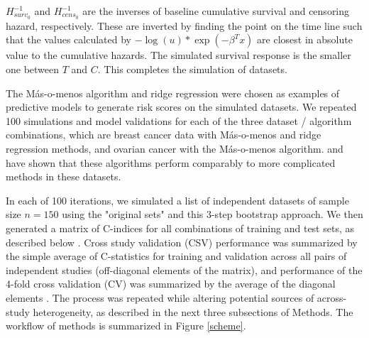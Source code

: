 \documentclass{bioinfo}
\begin{document}
    $H_{surv_{0}}^{-1}$ and $H_{cens_{0}}^{-1}$ are the inverses
    of baseline cumulative survival and censoring hazard, respectively.  These
    are inverted by finding
    the point on the time line such that the values calculated by
    $- \log(u) * \exp(- \beta^{T}x)$ are closest in absolute value to the
    cumulative hazards. The simulated survival response is the smaller one between
    $T$ and $C$. This completes the simulation of datasets.

	The M\'{a}s-o-menos algorithm \citep{Zhao2014, donoho2008higher} and ridge 
	regression \citep{hoerl1970ridge} were chosen as
    examples of predictive models to generate risk scores on the simulated datasets. 
    We repeated 100 simulations and model validations 
    for each of the three dataset / algorithm combinations, 
    which are breast cancer data with M\'{a}s-o-menos and ridge regression methods, 
    and ovarian cancer with the M\'{a}s-o-menos
    algorithm. \citet{Bernau2014} and \citet{Zhao2014} have shown that these algorithms
    perform comparably to more complicated methods in these datasets.
    
    In each of 100 iterations, we simulated a list of independent datasets of
    sample size $n=150$ using the "original sets" and this 3-step bootstrap approach.  We
    then generated a matrix of C-indices for all combinations of
    training and test sets, as described below
    \citep{Bernau2014}. %
    Cross study validation (CSV) performance was summarized by the
    simple average of C-statistics for training and validation across
    all pairs of independent studies (off-diagonal elements of the
    matrix), and performance of the 4-fold cross validation (CV) was summarized by the average
    of the diagonal elements \citep{Bernau2014}. The process was
    repeated while altering potential sources of across-study
    heterogeneity, as described in the next three subsections of
    Methods. The workflow of methods is summarized in Figure \ref{scheme}.
\end{document}
